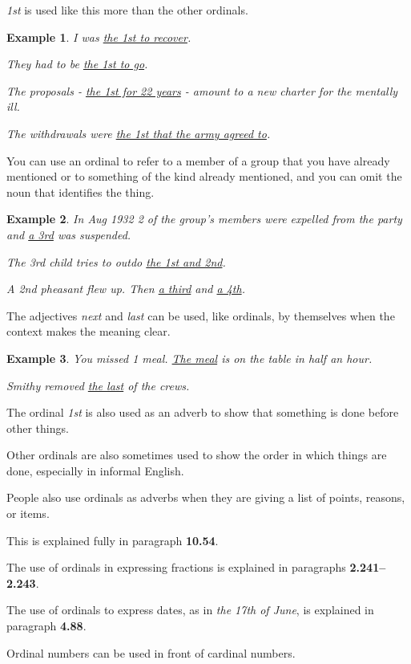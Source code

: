 \documentclass[oneside]{book}
\numberwithin{equation}{section}
\newtheorem{example}{Example}[section]
\begin{document}
\textit{1st} is used like this more than the other ordinals.
\begin{example}
    I was \underline{the 1st to recover}.
    
    They had to be \underline{the 1st to go}.
    
    The proposals - \underline{the 1st for 22 years} - amount to a new charter for the mentally ill.
    
    The withdrawals were \underline{the 1st that the army agreed to}.
\end{example}
%
\noindent{} You can use an ordinal to refer to a member of a group that you have already mentioned or to something of the kind already mentioned, and you can omit the noun that identifies the thing.
\begin{example}
    In Aug 1932 2 of the group's members were expelled from the party and \underline{a 3rd} was suspended.
    
    The 3rd child tries to outdo \underline{the 1st and 2nd}.
    
    A 2nd pheasant flew up. Then \underline{a third} and \underline{a 4th}.
\end{example}
%
\noindent{} The adjectives \textit{next} and \textit{last} can be used, like ordinals, by themselves when the context makes the meaning clear.
\begin{example}
    You missed 1 meal. \underline{The meal} is on the table in half an hour.
    
    Smithy removed \underline{the last} of the crews.
\end{example}
%
\noindent{} The ordinal \textit{1st} is also used as an adverb to show that something is done before other things.

Other ordinals are also sometimes used to show the order in which things are done, especially in informal English.

People also use ordinals as adverbs when they are giving a list of points, reasons, or items.

This is explained fully in paragraph \textbf{10.54}.

%
\noindent{} The use of ordinals in expressing fractions is explained in paragraphs \textbf{2.241--2.243}.

The use of ordinals to express dates, as in \textit{the 17th of June}, is explained in paragraph \textbf{4.88}.

%
Ordinal numbers can be used in front of cardinal numbers.
\end{document}
